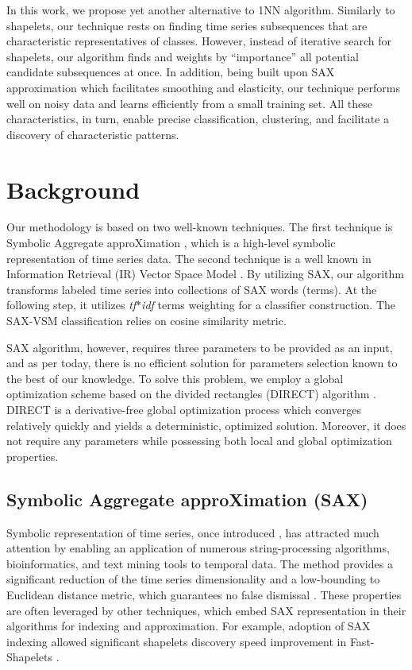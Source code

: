 \documentclass{llncs}
\begin{document}
In this work, we propose yet another alternative to 1NN algorithm. Similarly to shapelets, our
technique rests on finding time series subsequences that are characteristic representatives of
classes. 
However, instead of iterative search for shapelets, our algorithm finds and weights by
``importance'' all potential candidate subsequences at once. 
In addition, being built upon SAX approximation which facilitates smoothing and elasticity, 
our technique performs well on noisy data and learns efficiently from a small training set.
All these characteristics, in turn, enable precise classification, clustering, and facilitate 
a discovery of characteristic patterns.

\enlargethispage{0.5cm} 
\section{Background}
Our methodology is based on two well-known techniques. The first technique is 
Symbolic Aggregate approXimation \cite{sax}, which is a high-level symbolic  representation 
of time series data. The second technique is a well known in Information Retrieval (IR) 
Vector Space Model \cite{salton}. 
By utilizing SAX, our algorithm transforms labeled time series into collections of SAX 
words (terms). At the following step, it utilizes \textit{tf$\ast$idf} terms weighting for a 
classifier construction. The SAX-VSM classification relies on cosine similarity metric.

SAX algorithm, however, requires three parameters to be provided as an input, and as per 
today, there is no efficient solution for parameters selection known to the best of our knowledge. 
To solve this problem, we employ a global optimization scheme based on the divided rectangles
(DIRECT) algorithm \cite{direct}. DIRECT is a derivative-free global optimization process
which converges relatively quickly and yields a deterministic, optimized solution. Moreover, it
does not require any parameters while possessing both local and global optimization properties. 

\subsection{Symbolic Aggregate approXimation (SAX)}
Symbolic representation of time series, once introduced \cite{sax}, has attracted much attention by
enabling an application of numerous string-processing algorithms, bioinformatics, and text mining 
tools to temporal data. The method provides a significant reduction of the time series 
dimensionality and a low-bounding to Euclidean distance metric, which guarantees no false 
dismissal \cite{hot_sax}.
These properties are often leveraged by other techniques, which embed SAX representation 
in their algorithms for indexing and approximation. For example, adoption of SAX indexing 
allowed significant shapelets discovery speed improvement in Fast-Shapelets \cite{fast-shapelets}.
\end{document}
